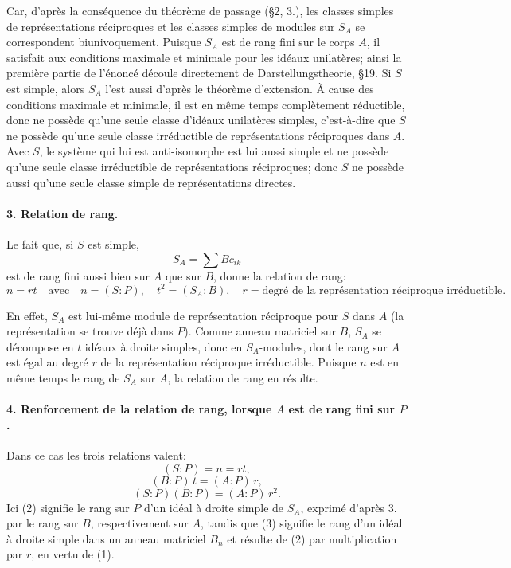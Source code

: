 Car, d'après la conséquence du théorème de passage (\S 2, 3.), les classes simples de représentations réciproques et les classes simples de modules sur \(S_A\) se correspondent biunivoquement. Puisque \(S_A\) est de rang fini sur le corps \(A\), il satisfait aux conditions maximale et minimale pour les idéaux unilatères; ainsi la première partie de l'énoncé découle directement de Darstellungstheorie, \S 19. Si \(S\) est simple, alors \(S_A\) l'est aussi d'après le théorème d'extension. À cause des conditions maximale et minimale, il est en même temps complètement réductible, donc ne possède qu'une seule classe d'idéaux unilatères simples, c'est-à-dire que \(S\) ne possède qu'une seule classe irréductible de représentations réciproques dans \(A\). Avec \(S\), le système qui lui est anti-isomorphe est lui aussi simple et ne possède qu'une seule classe irréductible de représentations réciproques; donc \(S\) ne possède aussi qu'une seule classe simple de représentations directes.

\paragraph{3. Relation de rang.}
Le fait que, si \(S\) est simple,
\[
        S_A=\sum Bc_{ik}
\]
est de rang fini aussi bien sur \(A\) que sur \(B\), donne la relation de rang:
\[
        n=rt\quad\text{avec}\quad n=(S:P),\quad t^2=(S_A:B),
        \quad r=\text{degré de la représentation réciproque irréductible}.      \tag{1}
\]

En effet, \(S_A\) est lui-même module de représentation réciproque pour \(S\) dans \(A\) (la représentation se trouve déjà dans \(P\)). Comme anneau matriciel sur \(B\), \(S_A\) se décompose en \(t\) idéaux à droite simples, donc en \(S_A\)-modules, dont le rang sur \(A\) est égal au degré \(r\) de la représentation réciproque irréductible. Puisque \(n\) est en même temps le rang de \(S_A\) sur \(A\), la relation de rang en résulte.

\paragraph{4. Renforcement de la relation de rang, lorsque \(A\) est de rang fini sur \(P\).}
Dans ce cas les trois relations valent:
\[
        (S:P)=n=rt,                                                     \tag{1}
\]
\[
        (B:P)\,t=(A:P)\,r,                                               \tag{2}
\]
\[
        (S:P)(B:P)=(A:P)\,r^2.                                           \tag{3}
\]
Ici (2) signifie le rang sur \(P\) d'un idéal à droite simple de \(S_A\), exprimé d'après 3. par le rang sur \(B\), respectivement sur \(A\), tandis que (3) signifie le rang d'un idéal à droite simple dans un anneau matriciel \(B_n\) et résulte de (2) par multiplication par \(r\), en vertu de (1).

\clearpage
